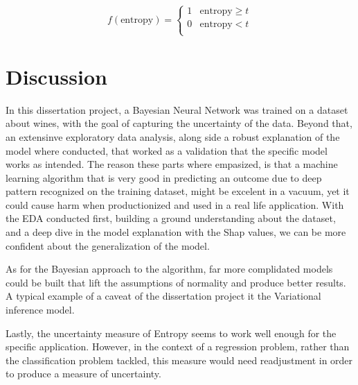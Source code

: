 \documentclass[11pt,twoside]{article}
\numberwithin{Theorem}{section}
\numberwithin{Definition}{section}
\numberwithin{Lemma}{section}
\numberwithin{Algorithm}{section}
\numberwithin{equation}{section}
\begin{document}
\[ 
f(\text{entropy})= \left\{
\begin{array}{ll}
      1 & \text{entropy} \geq t \\
      0 & \text{entropy} < t\\
\end{array} 
\right. 
\]

\cleardoublepage

\section{Discussion}
In this dissertation project, a Bayesian Neural Network was trained on a dataset about wines, with the goal of capturing the uncertainty of the data. Beyond that, an extensinve exploratory data analysis, along side a robust explanation of the model where conducted, that worked as a validation that the specific model works as intended. The reason these parts where empasized, is that a machine learning algorithm that is very good in predicting an outcome due to deep pattern recognized on the training dataset, might be excelent in a vacuum, yet it could cause harm when productionized and used in a real life application. With the EDA conducted first, building a ground understanding about the dataset, and a deep dive in the model explanation with the Shap values, we can be more confident about the generalization of the model. 

As for the Bayesian approach to the algorithm, far more complidated models could be built that lift the assumptions of normality and produce better results. A typical example of a caveat of the dissertation project it the Variational inference model.

Lastly, the uncertainty measure of Entropy seems to work well enough for the specific application. However, in the context of a regression problem, rather than the classification problem tackled, this measure would need readjustment in order to produce a measure of uncertainty.

\clearpage


\clearpage



\end{document}
